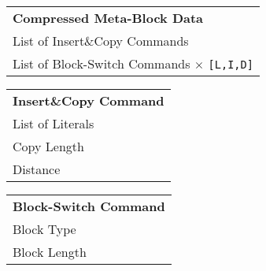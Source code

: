 \begin{tabular}{l}
	\textbf{Compressed Meta-Block Data} \\
	\addlinespace
	\hline
	\addlinespace
	List of Insert\&Copy Commands \\
	List of Block-Switch Commands $\times$ \verb|[L,I,D]| \\
\end{tabular}

\bigskip
\medskip

\begin{varwidth}[t]{\textwidth}
	\vspace{0pt}
	\centering
	
	\begin{tabular}[t]{l}
		\textbf{Insert\&Copy Command} \\
		\addlinespace
		\hline
		\addlinespace
		List of Literals\footnotemark \\
		Copy Length \\
		Distance\footnotemark \\
	\end{tabular}
	
\end{varwidth}%
\hspace{0.75cm}%
\begin{varwidth}[t]{\textwidth}
	\vspace{0pt}
	\centering
	
	\begin{tabular}[t]{l}
		\textbf{Block-Switch Command} \\
		\addlinespace
		\hline
		\addlinespace
		Block Type \\
		Block Length \\
	\end{tabular}
	
\end{varwidth}